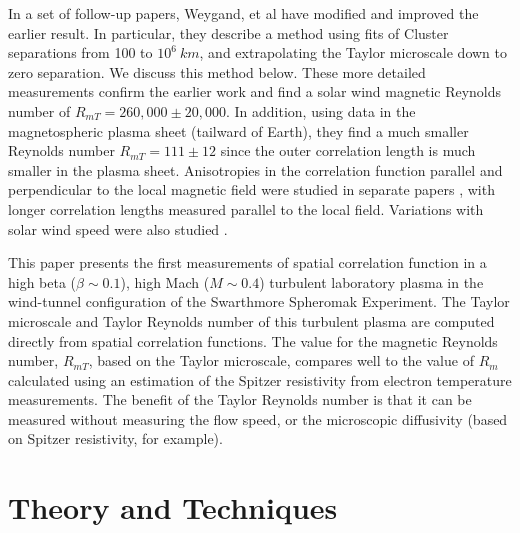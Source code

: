 \documentclass[aip,prl,amsmath,amssymb,reprint,superscriptaddress]{revtex4-1} %
\begin{document}
In a set of follow-up papers, Weygand, et al \cite{Weygand07,Weygand09,Weygand10,Weygand11} have modified and improved the earlier result.  In particular, they describe a method using fits of Cluster separations \cite{Weygand07} from 100 to $10^6~km$, and extrapolating the Taylor microscale down to zero separation.  We discuss this method below.  These more detailed measurements confirm the earlier work  \cite{Matthaeus05} and find a solar wind magnetic Reynolds number of $R_{mT}  = 260,000 \pm 20,000$.  In addition, using data in the magnetospheric plasma sheet (tailward of Earth), they find a much smaller Reynolds number $R_{mT}  = 111 \pm 12$ since the outer correlation length is much smaller in the plasma sheet.  Anisotropies in the correlation function parallel and perpendicular to the local magnetic field were studied in separate papers \cite{Weygand09,Weygand10}, with longer correlation lengths measured parallel to the local field.  Variations with solar wind speed were also studied \cite{Weygand11}.

This paper presents the first measurements of spatial correlation function in a high beta ($\beta \sim 0.1$), high Mach ($M \sim 0.4$) turbulent laboratory plasma in the wind-tunnel configuration of the Swarthmore Spheromak Experiment. The Taylor microscale and Taylor Reynolds number of this turbulent plasma are computed directly from spatial correlation functions. The value for the magnetic Reynolds number, $R_{mT}$, based on the Taylor microscale, compares well to the value of $R_{m}$ calculated using an estimation of the Spitzer resistivity from electron temperature measurements.  The benefit of the Taylor Reynolds number is that it can be measured without measuring the flow speed, or the microscopic diffusivity (based on Spitzer resistivity, for example).  


\section{Theory and Techniques}
\end{document}
